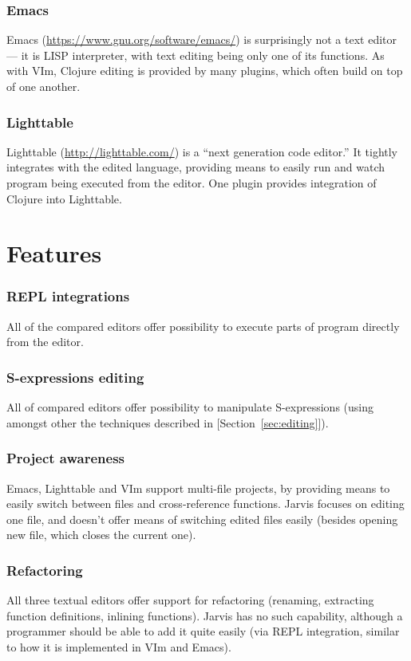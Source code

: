 \documentclass[english,mgr,shortabstract]{iithesis}
\begin{document}
\subsubsection*{Emacs}
Emacs (\url{https://www.gnu.org/software/emacs/}) is surprisingly not a text
editor --- it is LISP interpreter, with text editing being only one of its
functions. As with VIm, Clojure editing is provided by many plugins, which often
build on top of one another.

\subsubsection*{Lighttable}
Lighttable (\url{http://lighttable.com/}) is a ``next generation code editor.''
It tightly integrates with the edited language, providing means to easily run and
watch program being executed from the editor. One plugin provides integration of
Clojure into Lighttable.

\section{Features}
\subsubsection*{REPL integrations}
All of the compared editors offer possibility to execute parts of program
directly from the editor.

\subsubsection*{S-expressions editing}
All of compared editors offer possibility to manipulate S-expressions (using
amongst other the techniques described in [Section~\ref{sec:editing}]).
    
\subsubsection*{Project awareness}
Emacs, Lighttable and VIm support multi-file projects, by providing means to
easily switch between files and cross-reference functions. Jarvis focuses
on editing one file, and doesn't offer means of switching edited files easily
(besides opening new file, which closes the current one).
    
\subsubsection*{Refactoring}
All three textual editors offer support for refactoring (renaming, extracting function
definitions, inlining functions). Jarvis has no such capability, although
a programmer should be able to add it quite easily (via REPL integration,
similar to how it is implemented in VIm and Emacs).
    
\end{document}
